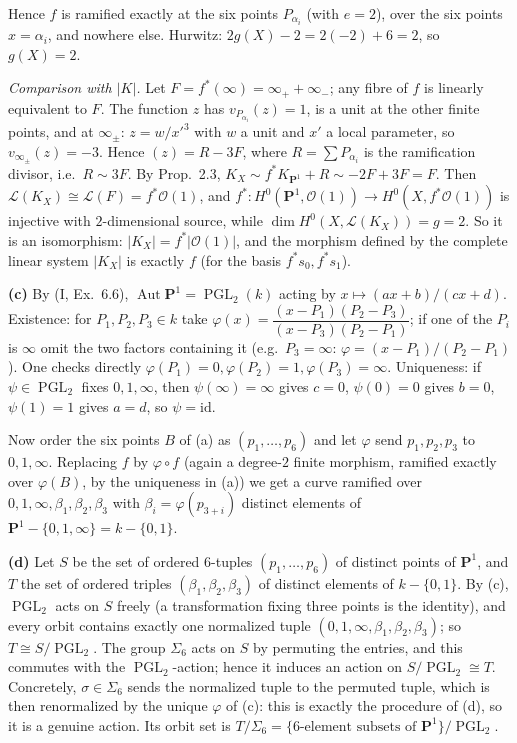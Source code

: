 \documentclass[11pt]{article}
\begin{document}
Hence $f$ is ramified exactly at the six points $P_{\alpha_i}$ (with $e=2$), over the six points $x=\alpha_i$, and nowhere else. Hurwitz: $2g(X)-2=2(-2)+6=2$, so $g(X)=2$.

\emph{Comparison with $|K|$.} Let $F=f^*(\infty)=\infty_++\infty_-$; any fibre of $f$ is linearly equivalent to $F$. The function $z$ has $v_{P_{\alpha_i}}(z)=1$, is a unit at the other finite points, and at $\infty_\pm$: $z=w/x'^3$ with $w$ a unit and $x'$ a local parameter, so $v_{\infty_\pm}(z)=-3$. Hence $(z)=R-3F$, where $R=\sum P_{\alpha_i}$ is the ramification divisor, i.e.\ $R\sim3F$. By Prop.~2.3, $K_X\sim f^*K_{\mathbf P^1}+R\sim-2F+3F=F$. Then $\mathcal L(K_X)\cong\mathcal L(F)=f^*\mathcal O(1)$, and $f^*:H^0(\mathbf P^1,\mathcal O(1))\to H^0(X,f^*\mathcal O(1))$ is injective with $2$-dimensional source, while $\dim H^0(X,\mathcal L(K_X))=g=2$. So it is an isomorphism: $|K_X|=f^*|\mathcal O(1)|$, and the morphism defined by the complete linear system $|K_X|$ is exactly $f$ (for the basis $f^*s_0,f^*s_1$).

\textbf{(c)} By (I, Ex.~6.6), $\operatorname{Aut}\mathbf P^1=\operatorname{PGL}_2(k)$ acting by $x\mapsto(ax+b)/(cx+d)$. Existence: for $P_1,P_2,P_3\in k$ take $\varphi(x)=\dfrac{(x-P_1)(P_2-P_3)}{(x-P_3)(P_2-P_1)}$; if one of the $P_i$ is $\infty$ omit the two factors containing it (e.g.\ $P_3=\infty$: $\varphi=(x-P_1)/(P_2-P_1)$). One checks directly $\varphi(P_1)=0,\varphi(P_2)=1,\varphi(P_3)=\infty$. Uniqueness: if $\psi\in\operatorname{PGL}_2$ fixes $0,1,\infty$, then $\psi(\infty)=\infty$ gives $c=0$, $\psi(0)=0$ gives $b=0$, $\psi(1)=1$ gives $a=d$, so $\psi=\mathrm{id}$.

Now order the six points $B$ of (a) as $(p_1,\dots,p_6)$ and let $\varphi$ send $p_1,p_2,p_3$ to $0,1,\infty$. Replacing $f$ by $\varphi\circ f$ (again a degree-$2$ finite morphism, ramified exactly over $\varphi(B)$, by the uniqueness in (a)) we get a curve ramified over $0,1,\infty,\beta_1,\beta_2,\beta_3$ with $\beta_i=\varphi(p_{3+i})$ distinct elements of $\mathbf P^1-\{0,1,\infty\}=k-\{0,1\}$.

\textbf{(d)} Let $S$ be the set of ordered $6$-tuples $(p_1,\dots,p_6)$ of distinct points of $\mathbf P^1$, and $T$ the set of ordered triples $(\beta_1,\beta_2,\beta_3)$ of distinct elements of $k-\{0,1\}$. By (c), $\operatorname{PGL}_2$ acts on $S$ freely (a transformation fixing three points is the identity), and every orbit contains exactly one normalized tuple $(0,1,\infty,\beta_1,\beta_2,\beta_3)$; so $T\cong S/\operatorname{PGL}_2$. The group $\Sigma_6$ acts on $S$ by permuting the entries, and this commutes with the $\operatorname{PGL}_2$-action; hence it induces an action on $S/\operatorname{PGL}_2\cong T$. Concretely, $\sigma\in\Sigma_6$ sends the normalized tuple to the permuted tuple, which is then renormalized by the unique $\varphi$ of (c): this is exactly the procedure of (d), so it is a genuine action. Its orbit set is $T/\Sigma_6=\{\text{6-element subsets of }\mathbf P^1\}/\operatorname{PGL}_2$.
\end{document}
